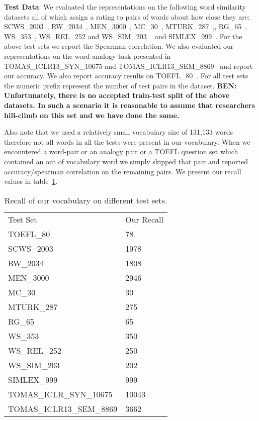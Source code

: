 \documentclass[11pt]{article}
\begin{document}
\textbf{Test Data}: We evaluated the representations on the
following word similarity datasets all of which assign a rating to
pairs of words about how close they are: 
SCWS\_2003~\cite{Huang2012Improving}, RW\_2034~\cite{Luong2013morpho}, MEN\_3000~\cite{bruni2012distributional},
MC\_30~\cite{miller1991contextual}, MTURK\_287~\cite{Radinsky2011word},,
RG\_65~\cite{Rubenstein1965Contextual},
WS\_353~\cite{finkelstein2001placing}, WS\_REL\_252 and WS\_SIM\_203 
~\cite{agirre2009study} and SIMLEX\_999~\cite{hill2014simlex}. For the
above test sets we report the Spearman correlation. 
We also evaluated our representations on the word analogy task
presented in TOMAS\_ICLR13\_SYN\_10675 and
TOMAS\_ICLR13\_SEM\_8869~\cite{mikolov2013distributed} and report our
accuracy.
We also report accuracy results on TOEFL\_80~\cite{landauer1997solution}.
For all test sets the numeric prefix represent the number of test
pairs in the dataset.
\textbf{BEN: Unfortunately, there is no accepted train-test split of the above datasets. In such a
scenario it is reasonable to assume that researchers hill-climb on
this set and we have done the same.}

Also note that we used a relatively small vocabulary size of 131,133
words therefore not all words in all the tests were present in our
vocabulary. When we encountered a word-pair or an analogy pair or a
TOEFL question set which contained an out of vocabulary word we simply
skipped that pair and reported accuracy/spearman correlation on the
remaining pairs. We present our recall values in table~\ref{tab:testrecall}.
\begin{table}[htbp]
  \centering
  \begin{tabular}{ll}
    Test Set   & Our Recall  \\
    TOEFL\_80  & 78 \\
    SCWS\_2003 & 1978 \\
    RW\_2034   & 1808 \\
    MEN\_3000  & 2946 \\
    MC\_30     & 30 \\
    MTURK\_287 & 275 \\
    RG\_65     & 65 \\
    WS\_353    & 350 \\
    WS\_REL\_252 & 250 \\
    WS\_SIM\_203 & 202 \\
    SIMLEX\_999  & 999 \\
    TOMAS\_ICLR\_SYN\_10675  & 10043 \\
    TOMAS\_ICLR13\_SEM\_8869 & 3662 \\
  \end{tabular}
  \caption{Recall of our vocabulary on different test sets.}
  \label{tab:testrecall}
\end{table}
\end{document}
